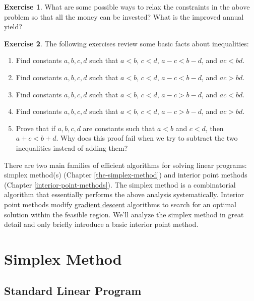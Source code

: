 \documentclass[
]{book}
\providecommand{\tightlist}{%
  \setlength{\itemsep}{0pt}\setlength{\parskip}{0pt}}
\theoremstyle{definition}
\theoremstyle{definition}
\theoremstyle{definition}
\newtheorem{exercise}{Exercise}[chapter]
\theoremstyle{definition}
\theoremstyle{remark}
\begin{document}
\begin{exercise}
What are some possible ways to relax the constraints in the above problem so that all the money can be invested? What is the improved annual yield?
\end{exercise}

\begin{exercise}

The following exercises review some basic facts about inequalities:

\begin{enumerate}
\def\labelenumi{\arabic{enumi}.}
\tightlist
\item
  Find constants \(a, b, c, d\) such that \(a < b\), \(c < d\), \(a - c < b - d\), and \(ac < bd\).
\item
  Find constants \(a, b, c, d\) such that \(a < b\), \(c < d\), \(a - c < b - d\), and \(ac > bd\).
\item
  Find constants \(a, b, c, d\) such that \(a < b\), \(c < d\), \(a - c > b - d\), and \(ac < bd\).
\item
  Find constants \(a, b, c, d\) such that \(a < b\), \(c < d\), \(a - c > b - d\), and \(ac > bd\).
\item
  Prove that if \(a, b, c, d\) are constants such that \(a < b\) and \(c < d\), then \(a + c < b + d\). Why does this proof fail when we try to subtract the two inequalities instead of adding them?
\end{enumerate}

\end{exercise}

There are two main families of efficient algorithms for solving linear programs: simplex method(s) (Chapter \ref{the-simplex-method}) and interior point methods (Chapter \ref{interior-point-methods}).
The simplex method is a combinatorial algorithm that essentially performs the above analysis systematically.
Interior point methods modify \href{https://en.wikipedia.org/wiki/Gradient_descent}{gradient descent} algorithms to search for an optimal solution within the feasible region. We'll analyze the simplex method in great detail and only briefly introduce a basic interior point method.

\hypertarget{part-simplex-method}{%
\part{Simplex Method}\label{part-simplex-method}}

\hypertarget{standard-linear-program}{%
\chapter{Standard Linear Program}\label{standard-linear-program}}
\end{document}
